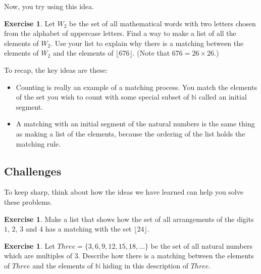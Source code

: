 \documentclass[12pt,letterpaper]{article}
\theoremstyle{definition}
\newtheorem{exercise}[question]{Exercise}
\begin{document}
Now, you try using this idea.
\begin{exercise}
Let $W_2$ be the set of all mathematical words with two letters chosen from the alphabet of uppercase letters.
Find a way to make a list of all the elements of $W_2$. 
Use your list to explain why there is a matching between the elements of $W_2$ and the elements of $\lfloor 676 \rfloor$.
(Note that $676 = 26\times 26$.)
\end{exercise}

To recap, the key ideas are these:
\begin{itemize}
\item Counting is really an example of a matching process. You match the elements of the set you wish to count with some special subset of $\mathbb{N}$ called an initial segment.
\item A matching with an initial segment of the natural numbers is the same thing as making a list of the elements, because the ordering of the list holds the matching rule.
\end{itemize}

\subsection*{Challenges}

To keep sharp, think about how the ideas we have learned can help you solve these problems.

\begin{exercise}
Make a list that shows how the set of all arrangements of the digits $1$, $2$, $3$ and $4$ has a matching with the set $\lfloor 24 \rfloor$.
\end{exercise}

\begin{exercise}
Let $Three = \{3, 6, 9, 12, 15, 18, \ldots\}$ be the set of all natural numbers which are multiples of $3$.
Describe how there is a matching between the elements of $Three$ and the elements of $\mathbb{N}$ hiding in this description of $Three$.
\end{exercise}

\end{document}
